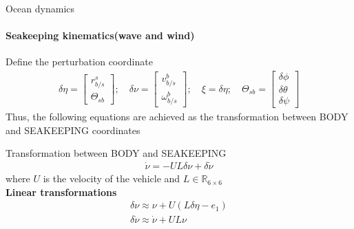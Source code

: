 \begin{frame}{Ocean dynamics}
	\framesubtitle{Seakeeping kinematics(wave and wind)}
	Define the perturbation coordinate
	\begin{align}
		\delta\eta = \begin{bmatrix}
			r_{b/s}^s \\ \Theta_{sb}
		\end{bmatrix}; \quad \delta \nu = \begin{bmatrix}
			v_{b/s}^b \\ \omega_{b/s}^b
		\end{bmatrix} ; \quad \xi = \delta \eta; \quad \Theta_{sb} = \begin{bmatrix}
			\delta\phi \\ \delta\theta \\ \delta\psi
		\end{bmatrix}
	\end{align}
	Thus, the following equations are achieved as the transformation between BODY and SEAKEEPING coordinates
	\begin{block}{Transformation between BODY and SEAKEEPING}
		\begin{align}
			\dot{\nu} = -UL\delta\nu + \delta\dot{\nu}
		\end{align}
		where $U$ is the velocity of the vehicle and $L \in \mathbb{R}_{6\times 6}$\\
		\textbf{Linear transformations}
		\begin{align}
			\delta\nu \approx \nu + U(L\delta\eta - e_1)\\
			\delta\dot{\nu} \approx \dot{\nu} + UL\nu
		\end{align}
	\end{block}
\end{frame}







